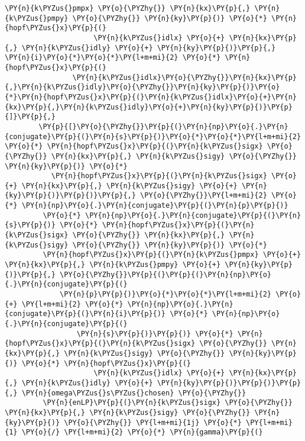 \begin{Verbatim}[commandchars=\\\{\}]
                 \PY{n}{k\PYZus{}pmpx} \PY{o}{\PYZhy{}} \PY{n}{kx}\PY{p}{,} \PY{n}{k\PYZus{}pmpy} \PY{o}{\PYZhy{}} \PY{n}{ky}\PY{p}{)} \PY{o}{*} \PY{n}{hopf\PYZus{}x}\PY{p}{(}
                     \PY{n}{k\PYZus{}idlx} \PY{o}{+} \PY{n}{kx}\PY{p}{,} \PY{n}{k\PYZus{}idly} \PY{o}{+} \PY{n}{ky}\PY{p}{)}\PY{p}{,} \PY{n}{i}\PY{o}{*}\PY{o}{*}\PY{l+m+mi}{2} \PY{o}{*} \PY{n}{hopf\PYZus{}x}\PY{p}{(}
                \PY{n}{k\PYZus{}idlx}\PY{o}{\PYZhy{}}\PY{n}{kx}\PY{p}{,}\PY{n}{k\PYZus{}idly}\PY{o}{\PYZhy{}}\PY{n}{ky}\PY{p}{)}\PY{o}{*}\PY{n}{hopf\PYZus{}x}\PY{p}{(}\PY{n}{k\PYZus{}idlx}\PY{o}{+}\PY{n}{kx}\PY{p}{,}\PY{n}{k\PYZus{}idly}\PY{o}{+}\PY{n}{ky}\PY{p}{)}\PY{p}{]}\PY{p}{,}
        \PY{p}{[}\PY{o}{\PYZhy{}}\PY{p}{(}\PY{n}{np}\PY{o}{.}\PY{n}{conjugate}\PY{p}{(}\PY{n}{s}\PY{p}{)}\PY{o}{*}\PY{o}{*}\PY{l+m+mi}{2} \PY{o}{*} \PY{n}{hopf\PYZus{}x}\PY{p}{(}\PY{n}{k\PYZus{}sigx} \PY{o}{\PYZhy{}} \PY{n}{kx}\PY{p}{,} \PY{n}{k\PYZus{}sigy} \PY{o}{\PYZhy{}} \PY{n}{ky}\PY{p}{)} \PY{o}{*}
           \PY{n}{hopf\PYZus{}x}\PY{p}{(}\PY{n}{k\PYZus{}sigx} \PY{o}{+} \PY{n}{kx}\PY{p}{,} \PY{n}{k\PYZus{}sigy} \PY{o}{+} \PY{n}{ky}\PY{p}{)}\PY{p}{)}\PY{p}{,} \PY{o}{\PYZhy{}}\PY{l+m+mi}{2} \PY{o}{*} \PY{n}{np}\PY{o}{.}\PY{n}{conjugate}\PY{p}{(}\PY{n}{p}\PY{p}{)}
         \PY{o}{*} \PY{n}{np}\PY{o}{.}\PY{n}{conjugate}\PY{p}{(}\PY{n}{s}\PY{p}{)} \PY{o}{*} \PY{n}{hopf\PYZus{}x}\PY{p}{(}\PY{n}{k\PYZus{}sigx} \PY{o}{\PYZhy{}} \PY{n}{kx}\PY{p}{,} \PY{n}{k\PYZus{}sigy} \PY{o}{\PYZhy{}} \PY{n}{ky}\PY{p}{)} \PY{o}{*}
         \PY{n}{hopf\PYZus{}x}\PY{p}{(}\PY{n}{k\PYZus{}pmpx} \PY{o}{+} \PY{n}{kx}\PY{p}{,} \PY{n}{k\PYZus{}pmpy} \PY{o}{+} \PY{n}{ky}\PY{p}{)}\PY{p}{,} \PY{o}{\PYZhy{}}\PY{p}{(}\PY{p}{(}\PY{n}{np}\PY{o}{.}\PY{n}{conjugate}\PY{p}{(}
             \PY{n}{p}\PY{p}{)}\PY{o}{*}\PY{o}{*}\PY{l+m+mi}{2} \PY{o}{+} \PY{l+m+mi}{2} \PY{o}{*} \PY{n}{np}\PY{o}{.}\PY{n}{conjugate}\PY{p}{(}\PY{n}{i}\PY{p}{)} \PY{o}{*} \PY{n}{np}\PY{o}{.}\PY{n}{conjugate}\PY{p}{(}
                 \PY{n}{s}\PY{p}{)}\PY{p}{)} \PY{o}{*} \PY{n}{hopf\PYZus{}x}\PY{p}{(}\PY{n}{k\PYZus{}sigx} \PY{o}{\PYZhy{}} \PY{n}{kx}\PY{p}{,} \PY{n}{k\PYZus{}sigy} \PY{o}{\PYZhy{}} \PY{n}{ky}\PY{p}{)} \PY{o}{*} \PY{n}{hopf\PYZus{}x}\PY{p}{(}
                     \PY{n}{k\PYZus{}idlx} \PY{o}{+} \PY{n}{kx}\PY{p}{,} \PY{n}{k\PYZus{}idly} \PY{o}{+} \PY{n}{ky}\PY{p}{)}\PY{p}{)}\PY{p}{,} \PY{n}{omega\PYZus{}s\PYZus{}chosen} \PY{o}{\PYZhy{}}
         \PY{n}{enLP}\PY{p}{(}\PY{n}{k\PYZus{}sigx} \PY{o}{\PYZhy{}} \PY{n}{kx}\PY{p}{,} \PY{n}{k\PYZus{}sigy} \PY{o}{\PYZhy{}} \PY{n}{ky}\PY{p}{)} \PY{o}{\PYZhy{}} \PY{l+m+mi}{1j} \PY{o}{*} \PY{l+m+mi}{1} \PY{o}{/} \PY{l+m+mi}{2} \PY{o}{*} \PY{n}{gamma}\PY{p}{(}

\end{Verbatim}
